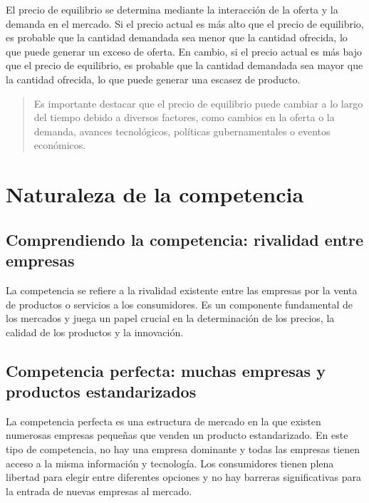 \documentclass[
  man,
  floatsintext,
  longtable,
  a4paper,
  nolmodern,
  notxfonts,
  notimes,
  12pt,
  colorlinks=true,linkcolor=blue,citecolor=blue,urlcolor=blue]{apa7}
\begin{document}
El precio de equilibrio se determina mediante la interacción de la
oferta y la demanda en el mercado. Si el precio actual es más alto que
el precio de equilibrio, es probable que la cantidad demandada sea menor
que la cantidad ofrecida, lo que puede generar un exceso de oferta. En
cambio, si el precio actual es más bajo que el precio de equilibrio, es
probable que la cantidad demandada sea mayor que la cantidad ofrecida,
lo que puede generar una escasez de producto.

\begin{quote}
Es importante destacar que el precio de equilibrio puede cambiar a lo
largo del tiempo debido a diversos factores, como cambios en la oferta o
la demanda, avances tecnológicos, políticas gubernamentales o eventos
económicos.
\end{quote}

\section{Naturaleza de la
competencia}\label{naturaleza-de-la-competencia}

\subsection{Comprendiendo la competencia: rivalidad entre
empresas}\label{comprendiendo-la-competencia-rivalidad-entre-empresas}

La competencia se refiere a la rivalidad existente entre las empresas
por la venta de productos o servicios a los consumidores. Es un
componente fundamental de los mercados y juega un papel crucial en la
determinación de los precios, la calidad de los productos y la
innovación.

\subsection{Competencia perfecta: muchas empresas y productos
estandarizados}\label{competencia-perfecta-muchas-empresas-y-productos-estandarizados}

La competencia perfecta es una estructura de mercado en la que existen
numerosas empresas pequeñas que venden un producto estandarizado. En
este tipo de competencia, no hay una empresa dominante y todas las
empresas tienen acceso a la misma información y tecnología. Los
consumidores tienen plena libertad para elegir entre diferentes opciones
y no hay barreras significativas para la entrada de nuevas empresas al
mercado.
\end{document}
